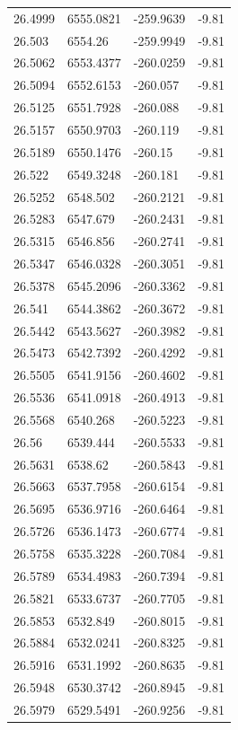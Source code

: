 \begin{table}[H]
\begin{tabular}{llll}
26.4999 & 6555.0821 & -259.9639 & -9.81 \\
26.503 & 6554.26 & -259.9949 & -9.81 \\
26.5062 & 6553.4377 & -260.0259 & -9.81 \\
26.5094 & 6552.6153 & -260.057 & -9.81 \\
26.5125 & 6551.7928 & -260.088 & -9.81 \\
26.5157 & 6550.9703 & -260.119 & -9.81 \\
26.5189 & 6550.1476 & -260.15 & -9.81 \\
26.522 & 6549.3248 & -260.181 & -9.81 \\
26.5252 & 6548.502 & -260.2121 & -9.81 \\
26.5283 & 6547.679 & -260.2431 & -9.81 \\
26.5315 & 6546.856 & -260.2741 & -9.81 \\
26.5347 & 6546.0328 & -260.3051 & -9.81 \\
26.5378 & 6545.2096 & -260.3362 & -9.81 \\
26.541 & 6544.3862 & -260.3672 & -9.81 \\
26.5442 & 6543.5627 & -260.3982 & -9.81 \\
26.5473 & 6542.7392 & -260.4292 & -9.81 \\
26.5505 & 6541.9156 & -260.4602 & -9.81 \\
26.5536 & 6541.0918 & -260.4913 & -9.81 \\
26.5568 & 6540.268 & -260.5223 & -9.81 \\
26.56 & 6539.444 & -260.5533 & -9.81 \\
26.5631 & 6538.62 & -260.5843 & -9.81 \\
26.5663 & 6537.7958 & -260.6154 & -9.81 \\
26.5695 & 6536.9716 & -260.6464 & -9.81 \\
26.5726 & 6536.1473 & -260.6774 & -9.81 \\
26.5758 & 6535.3228 & -260.7084 & -9.81 \\
26.5789 & 6534.4983 & -260.7394 & -9.81 \\
26.5821 & 6533.6737 & -260.7705 & -9.81 \\
26.5853 & 6532.849 & -260.8015 & -9.81 \\
26.5884 & 6532.0241 & -260.8325 & -9.81 \\
26.5916 & 6531.1992 & -260.8635 & -9.81 \\
26.5948 & 6530.3742 & -260.8945 & -9.81 \\
26.5979 & 6529.5491 & -260.9256 & -9.81 \\

\end{tabular}
\end{table}
